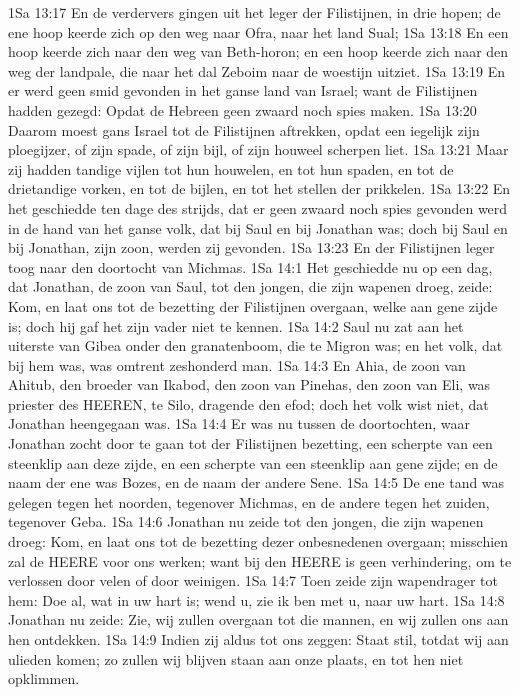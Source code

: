 1Sa 13:17  En de verdervers gingen uit het leger der Filistijnen, in drie hopen; de ene hoop keerde zich op den weg naar Ofra, naar het land Sual;
1Sa 13:18  En een hoop keerde zich naar den weg van Beth-horon; en een hoop keerde zich naar den weg der landpale, die naar het dal Zeboim naar de woestijn uitziet.
1Sa 13:19  En er werd geen smid gevonden in het ganse land van Israel; want de Filistijnen hadden gezegd: Opdat de Hebreen geen zwaard noch spies maken.
1Sa 13:20  Daarom moest gans Israel tot de Filistijnen aftrekken, opdat een iegelijk zijn ploegijzer, of zijn spade, of zijn bijl, of zijn houweel scherpen liet.
1Sa 13:21  Maar zij hadden tandige vijlen tot hun houwelen, en tot hun spaden, en tot de drietandige vorken, en tot de bijlen, en tot het stellen der prikkelen.
1Sa 13:22  En het geschiedde ten dage des strijds, dat er geen zwaard noch spies gevonden werd in de hand van het ganse volk, dat bij Saul en bij Jonathan was; doch bij Saul en bij Jonathan, zijn zoon, werden zij gevonden.
1Sa 13:23  En der Filistijnen leger toog naar den doortocht van Michmas.
1Sa 14:1  Het geschiedde nu op een dag, dat Jonathan, de zoon van Saul, tot den jongen, die zijn wapenen droeg, zeide: Kom, en laat ons tot de bezetting der Filistijnen overgaan, welke aan gene zijde is; doch hij gaf het zijn vader niet te kennen.
1Sa 14:2  Saul nu zat aan het uiterste van Gibea onder den granatenboom, die te Migron was; en het volk, dat bij hem was, was omtrent zeshonderd man.
1Sa 14:3  En Ahia, de zoon van Ahitub, den broeder van Ikabod, den zoon van Pinehas, den zoon van Eli, was priester des HEEREN, te Silo, dragende den efod; doch het volk wist niet, dat Jonathan heengegaan was.
1Sa 14:4  Er was nu tussen de doortochten, waar Jonathan zocht door te gaan tot der Filistijnen bezetting, een scherpte van een steenklip aan deze zijde, en een scherpte van een steenklip aan gene zijde; en de naam der ene was Bozes, en de naam der andere Sene.
1Sa 14:5  De ene tand was gelegen tegen het noorden, tegenover Michmas, en de andere tegen het zuiden, tegenover Geba.
1Sa 14:6  Jonathan nu zeide tot den jongen, die zijn wapenen droeg: Kom, en laat ons tot de bezetting dezer onbesnedenen overgaan; misschien zal de HEERE voor ons werken; want bij den HEERE is geen verhindering, om te verlossen door velen of door weinigen.
1Sa 14:7  Toen zeide zijn wapendrager tot hem: Doe al, wat in uw hart is; wend u, zie ik ben met u, naar uw hart.
1Sa 14:8  Jonathan nu zeide: Zie, wij zullen overgaan tot die mannen, en wij zullen ons aan hen ontdekken.
1Sa 14:9  Indien zij aldus tot ons zeggen: Staat stil, totdat wij aan ulieden komen; zo zullen wij blijven staan aan onze plaats, en tot hen niet opklimmen.
